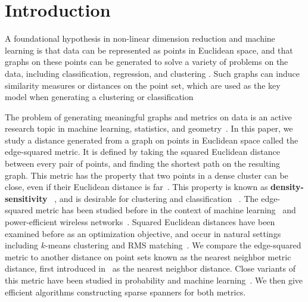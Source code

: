 \section{Introduction}

A foundational hypothesis in non-linear dimension reduction and machine
learning is that data can be represented as points in Euclidean space,
and that graphs on these points can be generated to solve a variety of
problems on the data, including classification, regression, and clustering \cite{Daitch09, Chen11,vL09, Dong11, Hashi15,
vonluxburg13density, mcqueen16megaman}.
Such graphs can induce similarity measures or distances on the point set,
which are used as the key model when generating a clustering or
classification~\cite{Daitch09, bijral11semiSupLearningDBD, tenenbaum00global}

The problem of generating meaningful graphs and metrics on data is an active research topic in machine learning, statistics, and
geometry~\cite{hein07graph, amenta99surface, sajama05estimatingDBDM, vincent03,
bijral11semiSupLearningDBD, Hashi15, alamgir12shortest, ting10analysis,
gorban07principal, bookDey2007, cavanna16adaptive, Gottlieb14, vL04,
agarwal16efficient, SridharMaster, hwang2016}.
%
In this paper, we study a distance generated from a graph
on points in Euclidean space called the edge-squared metric. It
is defined by taking the squared Euclidean distance between every pair of
points, and finding the shortest path on the resulting graph.
This metric has the property that two points
in a dense cluster can be close, even if their Euclidean
distance is far~\cite{bijral11semiSupLearningDBD}.
This property is known as \textbf{density-sensitivity}
~\cite{vincent03}, and is
desirable for clustering and classification
~\cite{sajama05estimatingDBDM, alamgir12shortest, hwang2016,
cohen15approximating}. The edge-squared metric has been studied
before in the
context of machine learning~\cite{bijral11semiSupLearningDBD, vincent03, hwang2016, alamgir12shortest,
cohen15approximating} and
power-efficient wireless
networks~\cite{LiWan2001, LiWan2002}.
Squared Euclidean distances have been
examined before as an optimization objective, and occur in
natural settings including $k$-means clustering and RMS
matching~\cite{macqueen67,Agarwal12}.
We compare the edge-squared metric to another
distance on point sets known as the nearest neighbor metric distance,
first introduced in~\cite{cohen15approximating} as the nearest neighbor
distance. Close variants of this metric have been studied in
probability and machine learning~\cite{sajama05estimatingDBDM, cohen15approximating,
hwang2016}. We then give efficient algorithms constructing sparse
spanners for both metrics.

